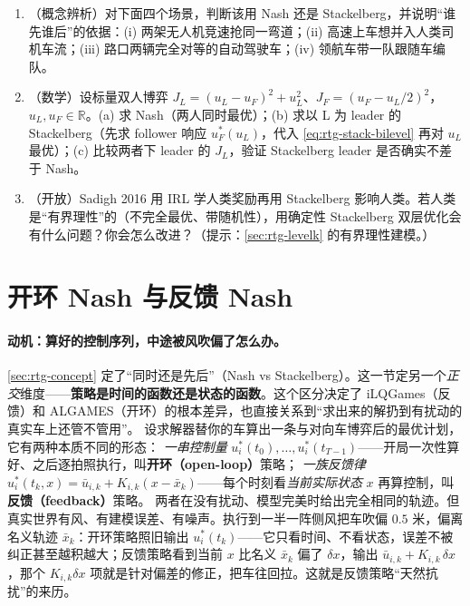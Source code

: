 \begin{practice}
\begin{enumerate}
  \item （概念辨析）对下面四个场景，判断该用 Nash 还是 Stackelberg，并说明“谁先谁后”的依据：(i) 两架无人机竞速抢同一弯道；(ii) 高速上车想并入人类司机车流；(iii) 路口两辆完全对等的自动驾驶车；(iv) 领航车带一队跟随车编队。
  \item （数学）设标量双人博弈 $J_L=(u_L-u_F)^2+u_L^2$、$J_F=(u_F-u_L/2)^2$，$u_L,u_F\in\mathbb{R}$。(a) 求 Nash（两人同时最优）；(b) 求以 L 为 leader 的 Stackelberg（先求 follower 响应 $u_F^*(u_L)$，代入 \cref{eq:rtg-stack-bilevel} 再对 $u_L$ 最优）；(c) 比较两者下 leader 的 $J_L$，验证 Stackelberg leader 是否确实不差于 Nash。
  \item （开放）Sadigh 2016 用 IRL 学人类奖励再用 Stackelberg 影响人类。若人类是“有界理性”的（不完全最优、带随机性），用确定性 Stackelberg 双层优化会有什么问题？你会怎么改进？（提示：\cref{sec:rtg-levelk} 的有界理性建模。）
\end{enumerate}
\end{practice}

\section{开环 Nash 与反馈 Nash}
\label{sec:rtg-olne-fbne}

\paragraph{动机：算好的控制序列，中途被风吹偏了怎么办。}
\cref{sec:rtg-concept} 定了“同时还是先后”（Nash vs Stackelberg）。这一节定另一个\emph{正交}维度——\textbf{策略是时间的函数还是状态的函数}。这个区分决定了 iLQGames（反馈）和 ALGAMES（开环）的根本差异，也直接关系到“求出来的解扔到有扰动的真实车上还管不管用”。
设求解器替你的车算出一条与对向车博弈后的最优计划，它有两种本质不同的形态：
\emph{一串控制量} $u_i^*(t_0),\dots,u_i^*(t_{T-1})$——开局一次性算好、之后逐拍照执行，叫\textbf{开环（open-loop）}策略；
\emph{一族反馈律} $u_i^*(t_k,x)=\bar u_{i,k}+K_{i,k}(x-\bar x_k)$——每个时刻看\emph{当前实际状态} $x$ 再算控制，叫\textbf{反馈（feedback）}策略。
两者在没有扰动、模型完美时给出完全相同的轨迹。但真实世界有风、有建模误差、有噪声。执行到一半一阵侧风把车吹偏 $0.5$ 米，偏离名义轨迹 $\bar x_k$：开环策略照旧输出 $u_i^*(t_k)$——它只看时间、不看状态，误差不被纠正甚至越积越大；反馈策略看到当前 $x$ 比名义 $\bar x_k$ 偏了 $\delta x$，输出 $\bar u_{i,k}+K_{i,k}\,\delta x$，那个 $K_{i,k}\delta x$ 项就是针对偏差的修正，把车往回拉。这就是反馈策略“天然抗扰”的来历。

